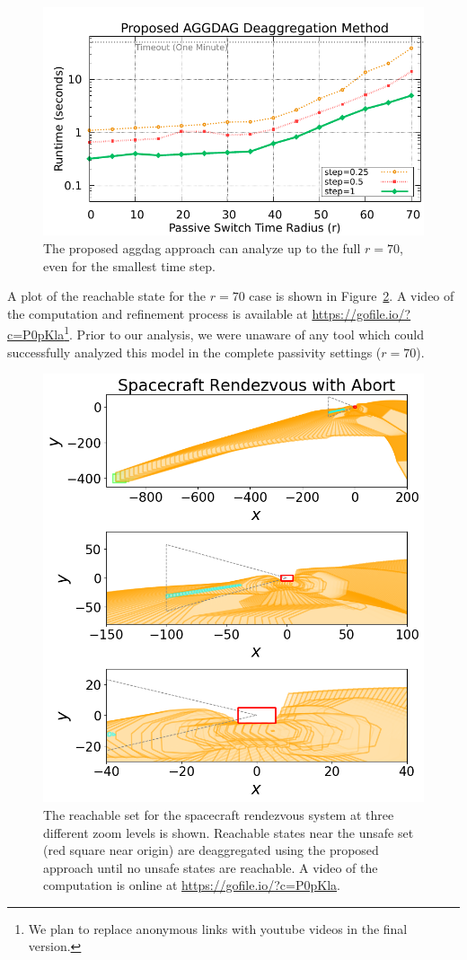 \begin{figure}[t]
\centerline{\includegraphics[width=0.9\columnwidth]{images/deagg.pdf}}
\caption{The proposed aggdag approach can analyze up to the full $r=70$, even for the smallest time step.}
\label{fig:deagg}
\end{figure}


A plot of the reachable state for the $r=70$ case is shown in Figure~\ref{fig:rendezvous}.
%
A video of the computation and refinement process is available at \url{https://gofile.io/?c=P0pKla}\footnote{We plan to replace
  anonymous links with youtube videos in the final version.}.
%
Prior to our analysis, we were unaware of any tool which could successfully analyzed this model in the complete passivity settings ($r=70$).

\begin{figure}[t]
\centerline{\includegraphics[width=0.8\columnwidth]{images/rendezvous.png}}
\vspace{-0.2cm}
\caption{{ The reachable set for the spacecraft rendezvous system at three different zoom levels is shown.
  Reachable states near the unsafe set (red square near origin) are deaggregated using the proposed approach until no unsafe states are reachable.
A video of the computation is online at \url{https://gofile.io/?c=P0pKla}.}}
\label{fig:rendezvous}
\end{figure}

